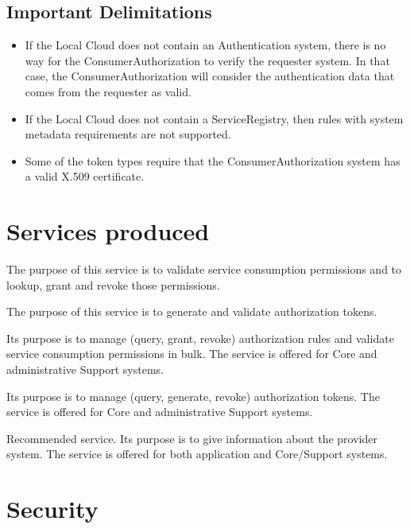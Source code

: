 \documentclass[a4paper]{arrowhead}
\begin{document}
\subsection{Important Delimitations}
\label{sec:delimitations}

\begin{itemize}
    \item  If the Local Cloud does not contain an Authentication system, there is no way for the ConsumerAuthorization to verify the requester system. In that case, the ConsumerAuthorization will consider the authentication data that comes from the requester as valid.
    \item If the Local Cloud does not contain a ServiceRegistry, then rules with system metadata requirements are not supported.
    \item Some of the token types require that the ConsumerAuthorization system has a valid X.509 certificate.
\end{itemize}

\newpage

\section{Services produced}
\label{sec:services}

The purpose of this service is to validate service consumption permissions and to lookup, grant and revoke those permissions.

The purpose of this service is to generate and validate authorization tokens.

Its purpose is to manage (query, grant, revoke) authorization rules and validate service consumption permissions in bulk. The service is offered for Core and administrative Support systems.  


Its purpose is to manage (query, generate, revoke) authorization tokens. The service is offered for Core and administrative Support systems.  

Recommended service. Its purpose is to give information about the provider system. The service is offered for both application and Core/Support systems.

\newpage

\section{Security}
\label{sec:security}
\end{document}
